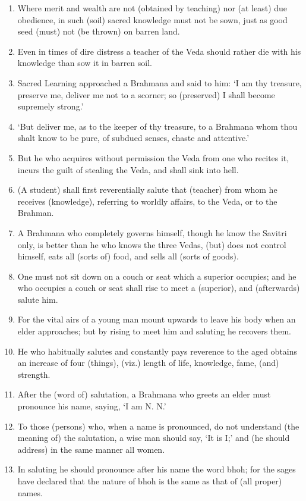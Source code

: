 \begin{enumerate}
\item Where merit and wealth are not (obtained by teaching) nor (at least) due obedience, in such (soil) sacred knowledge must not be sown, just as good seed (must) not (be thrown) on barren land.
\item Even in times of dire distress a teacher of the Veda should rather die with his knowledge than sow it in barren soil.
\item Sacred Learning approached a Brahmana and said to him: `I am thy treasure, preserve me, deliver me not to a scorner; so (preserved) I shall become supremely strong.'
\item `But deliver me, as to the keeper of thy treasure, to a Brahmana whom thou shalt know to be pure, of subdued senses, chaste and attentive.'
\item But he who acquires without permission the Veda from one who recites it, incurs the guilt of stealing the Veda, and shall sink into hell.
\item (A student) shall first reverentially salute that (teacher) from whom he receives (knowledge), referring to worldly affairs, to the Veda, or to the Brahman.
\item A Brahmana who completely governs himself, though he know the Savitri only, is better than he who knows the three Vedas, (but) does not control himself, eats all (sorts of) food, and sells all (sorts of goods).
\item One must not sit down on a couch or seat which a superior occupies; and he who occupies a couch or seat shall rise to meet a (superior), and (afterwards) salute him.
\item For the vital airs of a young man mount upwards to leave his body when an elder approaches; but by rising to meet him and saluting he recovers them.
\item He who habitually salutes and constantly pays reverence to the aged obtains an increase of four (things), (viz.) length of life, knowledge, fame, (and) strength.
\item After the (word of) salutation, a Brahmana who greets an elder must pronounce his name, saying, `I am N. N.'
\item To those (persons) who, when a name is pronounced, do not understand (the meaning of) the salutation, a wise man should say, `It is I;' and (he should address) in the same manner all women.
\item In saluting he should pronounce after his name the word bhoh; for the sages have declared that the nature of bhoh is the same as that of (all proper) names.

\end{enumerate}
